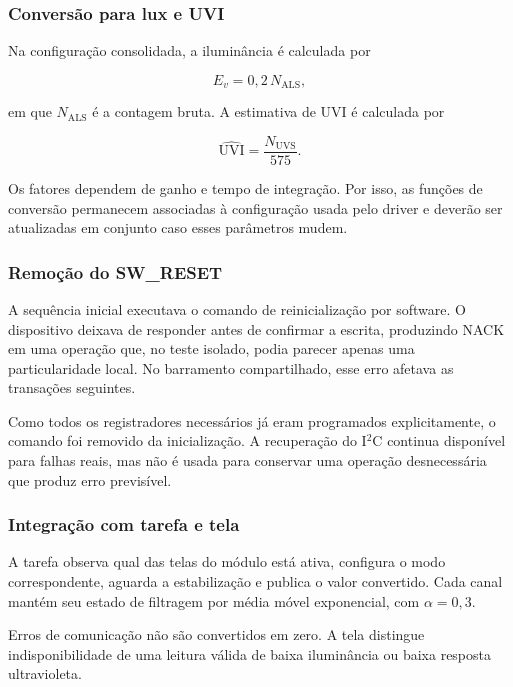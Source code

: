 \documentclass[a4paper,12pt]{article}
\begin{document}
\subsubsection{Convers\~ao para lux e UVI}


Na configura\c{c}\~ao consolidada, a ilumin\^ancia \'e calculada por


\[
E_v=0{,}2\,N_{\mathrm{ALS}},
\]


em que $N_{\mathrm{ALS}}$ \'e a contagem bruta. A estimativa de UVI \'e calculada por


\[
\widehat{\mathrm{UVI}}=\frac{N_{\mathrm{UVS}}}{575}.
\]


Os fatores dependem de ganho e tempo de integra\c{c}\~ao. Por isso, as fun\c{c}\~oes de convers\~ao permanecem associadas \`a configura\c{c}\~ao usada pelo driver e dever\~ao ser atualizadas em conjunto caso esses par\^ametros mudem.


\subsubsection{Remo\c{c}\~ao do SW\_RESET}


A sequ\^encia inicial executava o comando de reinicializa\c{c}\~ao por software. O dispositivo deixava de responder antes de confirmar a escrita, produzindo NACK em uma opera\c{c}\~ao que, no teste isolado, podia parecer apenas uma particularidade local. No barramento compartilhado, esse erro afetava as transa\c{c}\~oes seguintes.


Como todos os registradores necess\'arios j\'a eram programados explicitamente, o comando foi removido da inicializa\c{c}\~ao. A recupera\c{c}\~ao do I$^2$C continua dispon\'ivel para falhas reais, mas n\~ao \'e usada para conservar uma opera\c{c}\~ao desnecess\'aria que produz erro previs\'ivel.


\subsubsection{Integra\c{c}\~ao com tarefa e tela}


A tarefa observa qual das telas do m\'odulo est\'a ativa, configura o modo correspondente, aguarda a estabiliza\c{c}\~ao e publica o valor convertido. Cada canal mant\'em seu estado de filtragem por m\'edia m\'ovel exponencial, com $\alpha=0{,}3$.


Erros de comunica\c{c}\~ao n\~ao s\~ao convertidos em zero. A tela distingue indisponibilidade de uma leitura v\'alida de baixa ilumin\^ancia ou baixa resposta ultravioleta.
\end{document}
